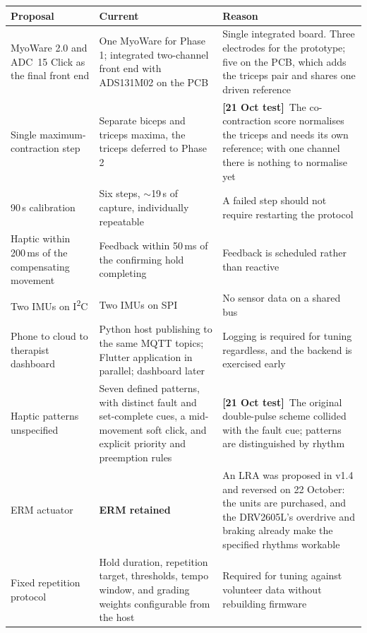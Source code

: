 \documentclass[11pt]{article}
\newcommand{\tested}{{\sffamily\scriptsize\color{good}\textbf{[21 Oct test]}}\ }
\begin{document}
\begin{table}[H]
\centering\small
\begin{tabularx}{\linewidth}{@{}p{36mm} p{36mm} X@{}}
\toprule
\textbf{Proposal} & \textbf{Current} & \textbf{Reason} \\
\midrule
MyoWare 2.0 and ADC~15 Click as the final front end & One MyoWare for Phase 1; integrated two-channel front end with ADS131M02 on the PCB & Single integrated board. Three electrodes for the prototype; five on the PCB, which adds the triceps pair and shares one driven reference \\
Single maximum-contraction step & Separate biceps and triceps maxima, the triceps deferred to Phase 2 & \tested The co-contraction score normalises the triceps and needs its own reference; with one channel there is nothing to normalise yet \\
90\,s calibration & Six steps, $\sim$19\,s of capture, individually repeatable & A failed step should not require restarting the protocol \\
Haptic within 200\,ms of the compensating movement & Feedback within 50\,ms of the confirming hold completing & Feedback is scheduled rather than reactive \\
Two IMUs on I\textsuperscript{2}C & Two IMUs on SPI & No sensor data on a shared bus \\
Phone to cloud to therapist dashboard & Python host publishing to the same MQTT topics; Flutter application in parallel; dashboard later & Logging is required for tuning regardless, and the backend is exercised early \\
Haptic patterns unspecified & Seven defined patterns, with distinct fault and set-complete cues, a mid-movement soft click, and explicit priority and preemption rules & \tested The original double-pulse scheme collided with the fault cue; patterns are distinguished by rhythm \\
ERM actuator & \textbf{ERM retained} & An LRA was proposed in v1.4 and reversed on 22 October: the units are purchased, and the DRV2605L's overdrive and braking already make the specified rhythms workable \\
Fixed repetition protocol & Hold duration, repetition target, thresholds, tempo window, and grading weights configurable from the host & Required for tuning against volunteer data without rebuilding firmware \\
\bottomrule
\end{tabularx}
\end{table}
\end{document}
